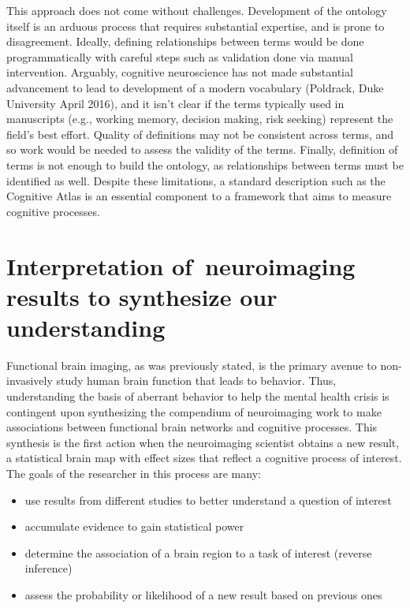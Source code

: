 \documentclass{report}
\begin{document}
This approach does not come without challenges. Development of the ontology itself is an arduous process that requires substantial expertise, and is prone to disagreement. Ideally, defining relationships between terms would be done programmatically with careful steps such as validation done via manual intervention. Arguably, cognitive neuroscience has not made substantial advancement to lead to development of a modern vocabulary (Poldrack, Duke University April 2016), and it isn't clear if the terms typically used in manuscripts (e.g., working memory, decision making, risk seeking) represent the field's best effort. Quality of definitions may not be consistent across terms, and so work would be needed to assess the validity of the terms. Finally, definition of terms is not enough to build the ontology, as relationships between terms must be identified as well. Despite these limitations, a standard description such as the Cognitive Atlas is an essential component to a framework that aims to measure cognitive processes.

\section{Interpretation of~neuroimaging results to synthesize our understanding}
Functional brain imaging, as was previously stated, is the primary avenue to non-invasively study
human brain function that leads to behavior. Thus, understanding the basis of aberrant behavior to help the mental health crisis is
contingent upon synthesizing the compendium of neuroimaging work to make
associations between functional brain networks and cognitive processes.
This synthesis is the first action when the neuroimaging scientist
obtains a new result, a statistical brain map with effect sizes that
reflect a cognitive process of interest. The goals of the researcher in
this process are many:

\begin{itemize}
\item
  use results from different studies to better understand a question of
  interest
\item
  accumulate evidence to gain statistical power
\item
  determine the association of a brain region to a task of interest
  (reverse inference)
\item
  assess the probability or likelihood of a new result based on previous
  ones
\end{itemize}
\end{document}

